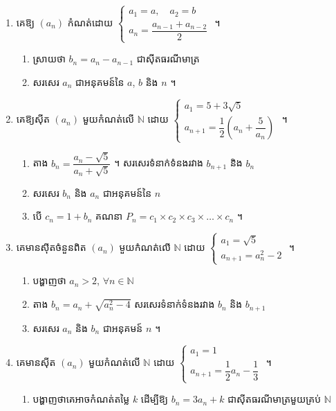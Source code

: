 \begin{enumerate}[1]
  \item គេឱ្យ $(a_n)$ កំណត់ដោយ $\begin{cases} a_1 = a, \quad a_2 = b\\ a_n = \dfrac{a_{n-1} + a_{n-2}}{2} \end{cases}$ ។
  \begin{enumerate}[a]
    \item ស្រាយថា $b_n = a_n - a_{n-1}$ ជាស៊ីតធរណីមាត្រ
    \item សរសេរ $a_n$ ជាអនុគមន៍នៃ $a$, $b$ និង $n$ ។
  \end{enumerate}
  \item គេឱ្យស៊ីត $(a_n)$ មួយកំណត់លើ $\mathbb{N}$ ដោយ $\begin{cases} a_1 = 5 + 3\sqrt{5}\\ a_{n+1} = \dfrac{1}{2}\left(a_n + \dfrac{5}{a_n}\right) \end{cases}$ ។
  \begin{enumerate}[a]
    \item តាង $b_n = \dfrac{a_n - \sqrt{5}}{a_n + \sqrt{5}}$ ។ សរសេរទំនាក់ទំនងរវាង $b_{n+1}$ និង $b_n$
    \item សរសេរ $b_n$ និង $a_n$ ជាអនុគមន៍នៃ $n$
    \item បើ $c_n = 1 + b_n$ គណនា $P_n = c_1 \times c_2 \times c_3 \times \ldots \times c_n$ ។
  \end{enumerate}
  \item គេមានស៊ីតចំនួនពិត $(a_n)$ មួយកំណត់លើ $\mathbb{N}$ ដោយ $\begin{cases} a_1 = \sqrt{5}\\ a_{n+1} = a_n^2 - 2 \end{cases}$ ។
  \begin{enumerate}[a]
    \item បង្ហាញថា $a_n > 2$, $\forall n \in \mathbb{N}$
    \item តាង $b_n = a_n + \sqrt{a_n^2 - 4}$ សរសេរទំនាក់ទំនងរវាង $b_n$ និង $b_{n+1}$
    \item សរសេរ $a_n$ និង $b_n$ ជាអនុគមន៍ $n$ ។
  \end{enumerate}
  \item គេមានស៊ីត $(a_n)$ មួយកំណត់លើ $\mathbb{N}$ ដោយ $\begin{cases} a_1 = 1\\ a_{n+1} = \dfrac{1}{2}a_n - \dfrac{1}{3} \end{cases}$ ។
  \begin{enumerate}[a]
    \item បង្ហាញថាគេអាចកំណត់តម្លៃ $k$ ដើម្បីឱ្យ $b_n = 3a_n + k$ ជាស៊ីតធរណីមាត្រមួយគ្រប់ $\mathbb{N}$

\end{enumerate}
\end{enumerate}
